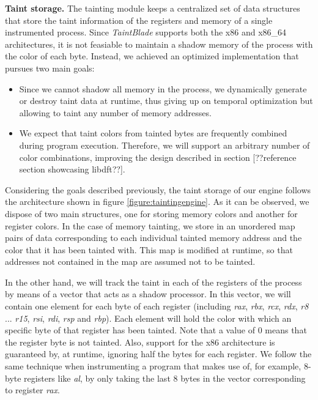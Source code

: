\documentclass[conference]{IEEEtran}
\begin{document}
\textbf{Taint storage.} The tainting module keeps a centralized set
of data structures that store the taint information of the registers and memory of
a single instrumented process.
Since \textit{TaintBlade} supports both the x86 and x86\_64 architectures, it is not feasiable to
maintain a shadow memory of the process with the color of each byte. Instead, we
achieved an optimized implementation that pursues two main goals:
\begin{itemize}
    \item Since we cannot shadow all memory in the process, we dynamically generate or
          destroy taint data at runtime, thus giving up on temporal optimization but
          allowing to taint any number of memory addresses.
    \item We expect that taint colors from tainted bytes are frequently combined during
          program execution. Therefore, we will support an arbitrary number of color
          combinations, improving the design described in section [??reference section
            showcasing libdft??].
\end{itemize}

Considering the goals described previously, the taint storage of our engine
follows the architecture shown in figure \ref{figure:taintingengine}. As it can
be observed, we dispose of two main structures, one for storing memory colors
and another for register colors. In the case of memory tainting, we store in an
unordered map pairs of data corresponding to each individual tainted memory
address and the color that it has been tainted with. This map is modified at
runtime, so that addresses not contained in the map are assumed not to be
tainted.

In the other hand, we will track the taint in each of the registers of the
process by means of a vector that acts as a shadow processor. In this vector,
we will contain one element for each byte of each register (including
\textit{rax}, \textit{rbx}, \textit{rcx}, \textit{rdx}, \textit{r8} ...
\textit{r15}, \textit{rsi}, \textit{rdi}, \textit{rsp} and \textit{rbp}). Each
element will hold the color with which an specific byte of that register has
been tainted. Note that a value of 0 means that the register byte is not
tainted. Also, support for the x86 architecture is guaranteed by, at runtime,
ignoring half the bytes for each register. We follow the same technique when
instrumenting a program that makes use of, for example, 8-byte registers like
\textit{al}, by only taking the last 8 bytes in the vector corresponding to
register \textit{rax}.
\end{document}
